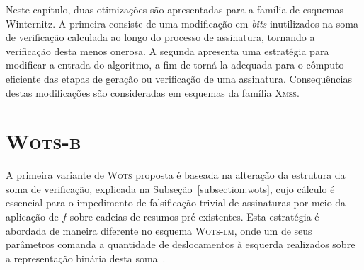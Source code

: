 \documentclass[12pt,notitlepage]{report}
\newcommand{\wots}{\textsc{Wots}}
\newcommand{\wotslm}{\textsc{Wots-lm}}
\newcommand{\xmss}{\textsc{Xmss}}
\begin{document}
Neste capítulo, duas otimizações são apresentadas para a família de esquemas Winternitz. A primeira consiste de uma modificação em \emph{bits} inutilizados na soma de verificação calculada ao longo do processo de assinatura, tornando a verificação desta menos onerosa. A segunda apresenta uma estratégia para modificar a entrada do algoritmo, a fim de torná-la adequada para o cômputo eficiente das etapas de geração ou verificação de uma assinatura. Consequências destas modificações são consideradas em esquemas da família \xmss{}.

\section{\textsc{Wots-b}}
\label{section:wotsb}

A primeira variante de \wots{} proposta é baseada na alteração da estrutura da soma de verificação, explicada na Subseção~\ref{subsection:wots}, cujo cálculo é essencial para o impedimento de falsificação trivial de assinaturas por meio da aplicação de $f$ sobre cadeias de resumos pré-existentes. Esta estratégia é abordada de maneira diferente no esquema \wotslm{}, onde um de seus parâmetros comanda a quantidade de deslocamentos à esquerda realizados sobre a representação binária desta soma~\cite[4.4]{mcgrew-hash-sigs-11}.
\end{document}

